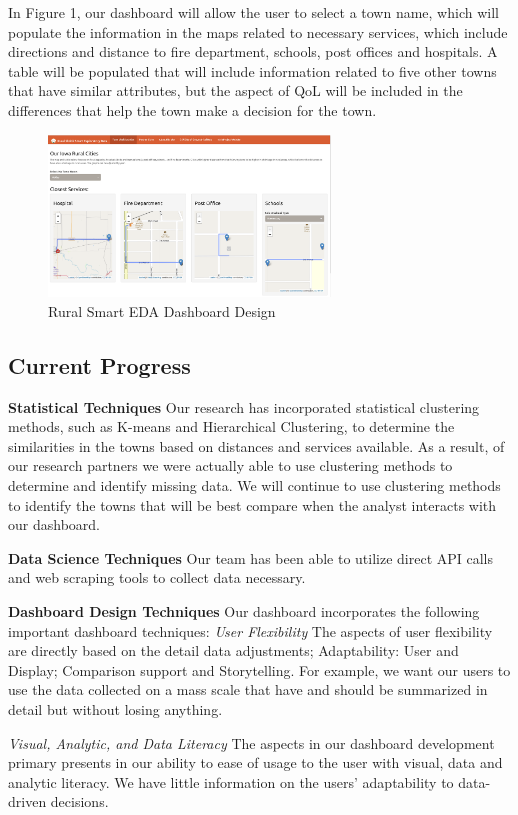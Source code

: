 \documentclass[10pt]{article}\usepackage[]{graphicx}\usepackage[]{color}
\begin{document}
In Figure 1, our dashboard will allow the user to select a town name, which will populate the  information in the maps related to necessary services, which include directions and distance to fire department, schools, post offices and hospitals. A table will be populated that will include information related to five other towns that have similar attributes, but the aspect of QoL will be included in the differences that help the town make a decision for the town. 

\begin{figure}[ht!]
\centering
\includegraphics[width=75mm]{SCC_Dashboard.png}
\caption{Rural Smart EDA Dashboard Design}
\end{figure}


\subsection{Current Progress}
{\bf Statistical Techniques} Our research has incorporated statistical clustering methods, such as K-means and Hierarchical Clustering, to determine the similarities in the towns based on distances and services available. As a result, of our research partners we were actually able to use clustering methods to determine and identify missing data. We will continue to use clustering methods to identify the towns that will be best compare when the analyst interacts with our dashboard. 

{\bf Data Science Techniques} Our team has been able to utilize direct API calls and web scraping tools to collect data necessary.  

{\bf Dashboard Design Techniques} Our dashboard incorporates the following important dashboard techniques:
{\it User Flexibility} The aspects of user flexibility are directly based on the detail data adjustments; Adaptability: User and Display; Comparison support and Storytelling. For example, we want our users to use the data collected on a mass scale that have and should be summarized in detail but without losing anything.

{\it Visual, Analytic, and Data Literacy} The aspects in our dashboard development primary presents in our ability to ease of usage to the user with visual, data  and analytic literacy. We have little information on the users' adaptability to data-driven decisions. 
\end{document}
